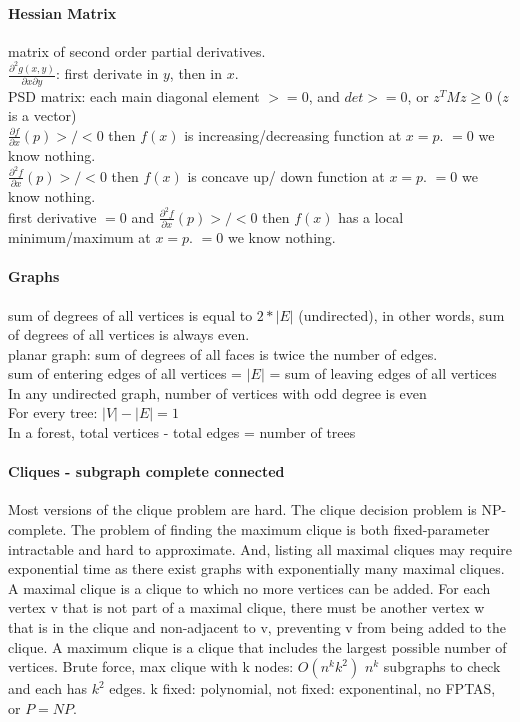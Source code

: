 \documentclass[main]{subfiles}
\begin{document}
\paragraph{Hessian Matrix}
matrix of second order partial derivatives.\\
$\frac{\partial^2 g(x,y)}{\partial x \partial y}$: first derivate in $y$,
then in $x$.\\
PSD matrix: each main diagonal element $>=0$, and $det >=0$, or $z^T M z \geq 0$
($z$ is a vector)\\
$\frac{\partial f}{\partial x}(p) >/< 0$ then $f(x)$ is increasing/decreasing
function at $x=p$. $=0$ we know nothing.\\
$\frac{\partial^2 f}{\partial x}(p) >/< 0$ then $f(x)$ is concave up/
down function at $x=p$. $=0$ we know nothing.\\
first derivative $= 0$ and $\frac{\partial^2 f}{\partial x}(p) >/< 0$ then
$f(x)$ has a local minimum/maximum at $x=p$. $=0$ we know nothing.\\

\paragraph{Graphs}
sum of degrees of all vertices is equal to $2 * |E|$ (undirected),
in other words, sum of degrees of all vertices is always even.\\
planar graph: sum of degrees of all faces is twice the number of edges.\\
sum of entering edges of all vertices = $|E|$ = sum of leaving edges of all
vertices\\
In any undirected graph, number of vertices with odd degree is even\\
For every tree: $|V| - |E| = 1$\\
In a forest, total vertices - total edges = number of trees

\paragraph{Cliques - subgraph complete connected}
Most versions of the clique problem are hard. The clique decision problem is
NP-complete. The problem of finding the maximum clique is both fixed-parameter
intractable and hard to approximate. And, listing all maximal cliques may
require exponential time as there exist graphs with exponentially many maximal
cliques. A maximal clique is a clique to which no more vertices can be added.
For each vertex v that is not part of a maximal clique, there must be another
vertex w that is in the clique and non-adjacent to v, preventing v from being
added to the clique. A maximum clique is a clique that includes the largest
possible number of vertices. Brute force, max clique with k nodes: $O(n^k k^2)$
$n^k$ subgraphs to check and each has $k^2$ edges. k fixed: polynomial, not 
fixed: exponentinal, no FPTAS, or $P=NP$.
\end{document}
